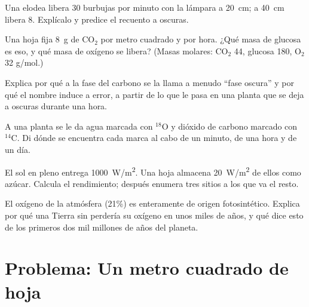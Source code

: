 \begin{exercise}[$\star\star$]\label{exo:g12:photosynthesis:10}
Una elodea libera 30 burbujas por minuto con la lámpara a
\qty{20}{cm}; a \qty{40}{cm} libera 8. Explícalo y predice el recuento
a oscuras.
\end{exercise}

\begin{exercise}[$\star\star$]\label{exo:g12:photosynthesis:11}
Una hoja fija \qty{8}{g} de $\mathrm{CO_2}$ por metro cuadrado y por
hora. ¿Qué masa de glucosa es eso, y qué masa de oxígeno se libera?
(Masas molares: $\mathrm{CO_2}$ 44, glucosa 180, $\mathrm{O_2}$ 32
\unit{g/mol}.)
\end{exercise}

\begin{exercise}[$\star\star\star$]\label{exo:g12:photosynthesis:12}
Explica por qué a la fase del carbono se la llama a menudo ``fase
oscura'' y por qué el nombre induce a error, a partir de lo que le pasa
en una planta que se deja a oscuras durante una hora.
\end{exercise}

\begin{exercise}[$\star\star\star$]\label{exo:g12:photosynthesis:13}
A una planta se le da agua marcada con $^{18}$O y dióxido de carbono
marcado con $^{14}$C. Di dónde se encuentra cada marca al cabo de un
minuto, de una hora y de un día.
\end{exercise}

\begin{exercise}[$\star\star\star$]\label{exo:g12:photosynthesis:14}
El sol en pleno entrega \qty{1000}{W/m^2}. Una hoja almacena
\qty{20}{W/m^2} de ellos como azúcar. Calcula el rendimiento; después
enumera tres sitios a los que va el resto.
\end{exercise}

\begin{exercise}[$\star\star\star$]\label{exo:g12:photosynthesis:15}
El oxígeno de la atmósfera (21\%) es enteramente de origen
fotosintético. Explica por qué una Tierra sin  perdería su
oxígeno en unos miles de años, y qué dice esto de los primeros dos mil
millones de años del planeta.
\end{exercise}

\section{Problema: Un metro cuadrado de hoja}

